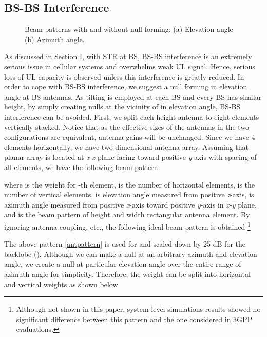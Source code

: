 \documentclass[twocolumn]{IEEEtran}
\begin{document}
\subsection{BS-BS Interference}

\begin{figure}[!t]


\caption{Beam patterns with and without null forming: (a) Elevation
angle (b) Azimuth angle. \label{beam} }

\end{figure}

As discussed in Section I, with STR at BS, BS-BS interference is an
extremely serious issue in cellular systems and overwhelms weak UL
signal. Hence, serious loss of UL capacity is observed unless this
interference is greatly reduced. In order to cope with BS-BS
interference, we suggest a null forming in elevation angle at BS
antennas. As tilting is employed at each BS and every BS has similar
height, by simply creating nulls at the vicinity of  in
elevation angle, BS-BS interference can be avoided. First, we split
each  height antenna to eight  elements
vertically stacked. Notice that as the effective sizes of the
antennas in the two configurations are equivalent, antenna gains
will be unchanged. Since we have 4 elements horizontally, we have
two dimensional  antenna array. Assuming that  planar array is located at \textit{x-z} plane facing toward
positive \textit{y}-axis with  spacing of all elements,
we have the following beam pattern


where  is the weight for -th element,  is the
number of horizontal elements,  is the number of vertical
elements,  is elevation angle measured from positive
\textit{z}-axis,  is azimuth angle measured from positive
\textit{x}-axis toward positive \textit{y}-axis in \textit{x-y}
plane, and  is the beam pattern of  height and  width rectangular antenna element.
By ignoring antenna coupling, etc., the following ideal beam pattern
is obtained \footnote{Although not shown in this paper, system level
simulations results showed no significant difference between this
pattern and the one considered in 3GPP evaluations.}


The above pattern \eqref{antpattern} is used for  and scaled down by 25 dB for the backlobe ().
Although we can make a null at an arbitrary azimuth and elevation
angle, we create a null at particular elevation angle over the
entire range of azimuth angle for simplicity. Therefore, the weight
 can be split into horizontal and vertical weights as shown
below
\end{document}
